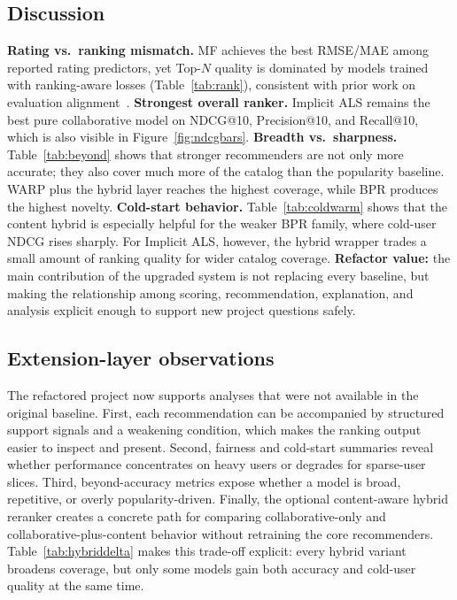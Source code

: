 \documentclass[sigconf,nonacm]{acmart}
\begin{document}
\subsection{Discussion}
\textbf{Rating vs.\ ranking mismatch.} MF achieves the best RMSE/MAE among reported rating predictors, yet Top-$N$ quality is dominated by models trained with ranking-aware losses (Table~\ref{tab:rank}), consistent with prior work on evaluation alignment~\cite{cremonesi2010}. \textbf{Strongest overall ranker.} Implicit ALS remains the best pure collaborative model on NDCG@10, Precision@10, and Recall@10, which is also visible in Figure~\ref{fig:ndcgbars}. \textbf{Breadth vs.\ sharpness.} Table~\ref{tab:beyond} shows that stronger recommenders are not only more accurate; they also cover much more of the catalog than the popularity baseline. WARP plus the hybrid layer reaches the highest coverage, while BPR produces the highest novelty. \textbf{Cold-start behavior.} Table~\ref{tab:coldwarm} shows that the content hybrid is especially helpful for the weaker BPR family, where cold-user NDCG rises sharply. For Implicit ALS, however, the hybrid wrapper trades a small amount of ranking quality for wider catalog coverage. \textbf{Refactor value:} the main contribution of the upgraded system is not replacing every baseline, but making the relationship among scoring, recommendation, explanation, and analysis explicit enough to support new project questions safely.

\subsection{Extension-layer observations}
The refactored project now supports analyses that were not available in the original baseline. First, each recommendation can be accompanied by structured support signals and a weakening condition, which makes the ranking output easier to inspect and present. Second, fairness and cold-start summaries reveal whether performance concentrates on heavy users or degrades for sparse-user slices. Third, beyond-accuracy metrics expose whether a model is broad, repetitive, or overly popularity-driven. Finally, the optional content-aware hybrid reranker creates a concrete path for comparing collaborative-only and collaborative-plus-content behavior without retraining the core recommenders. Table~\ref{tab:hybriddelta} makes this trade-off explicit: every hybrid variant broadens coverage, but only some models gain both accuracy and cold-user quality at the same time.
\end{document}
